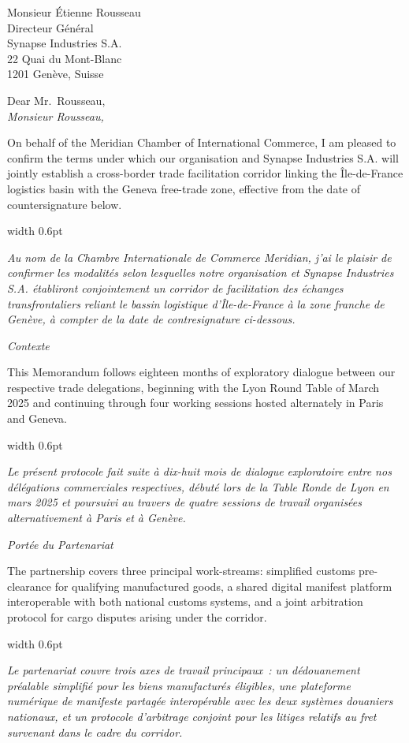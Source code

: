 \documentclass[paper=a4,fontsize=11pt,parskip=half,DIV=11,headsepline,footsepline,addrfield=true,backaddress=false,locfield=narrow,foldmarks=off,enlargefirstpage=on]{scrlttr2}
\newcommand{\bilingual}[2]{%
\noindent\begin{minipage}[t]{0.475\textwidth}\raggedright\small #1\end{minipage}\hspace{0.012\textwidth}%
{\color{gold}\vrule width 0.6pt}\hspace{0.012\textwidth}%
\begin{minipage}[t]{0.475\textwidth}\raggedright\small\itshape #2\end{minipage}\par\smallskip
}
\newcommand{\sectiontitle}[2]{%
\vspace{2pt}\noindent{\color{navy}\bfseries\large #1}\hfill{\color{gold}\itshape\small #2}\par
\noindent{\color{gold}\rule{\dimexpr\linewidth-11pt\relax}{0.7pt}}\par\smallskip
}
\begin{document}
\begin{letter}{Monsieur \'Etienne Rousseau\\Directeur G\'en\'eral\\Synapse Industries S.A.\\22 Quai du Mont-Blanc\\1201 Gen\`eve, Suisse}

\opening{Dear Mr.~Rousseau,\\[2pt]\textit{Monsieur Rousseau,}}

\bilingual{%
On behalf of the Meridian Chamber of International Commerce, I am pleased to confirm the terms under which our organisation and Synapse Industries S.A. will jointly establish a cross-border trade facilitation corridor linking the \^Ile-de-France logistics basin with the Geneva free-trade zone, effective from the date of countersignature below.
}{%
Au nom de la Chambre Internationale de Commerce Meridian, j'ai le plaisir de confirmer les modalit\'es selon lesquelles notre organisation et Synapse Industries S.A. \'etabliront conjointement un corridor de facilitation des \'echanges transfrontaliers reliant le bassin logistique d'\^Ile-de-France \`a la zone franche de Gen\`eve, \`a compter de la date de contresignature ci-dessous.
}

\sectiontitle{Background}{Contexte}

\bilingual{%
This Memorandum follows eighteen months of exploratory dialogue between our respective trade delegations, beginning with the Lyon Round Table of March 2025 and continuing through four working sessions hosted alternately in Paris and Geneva.
}{%
Le pr\'esent protocole fait suite \`a dix-huit mois de dialogue exploratoire entre nos d\'el\'egations commerciales respectives, d\'ebut\'e lors de la Table Ronde de Lyon en mars 2025 et poursuivi au travers de quatre sessions de travail organis\'ees alternativement \`a Paris et \`a Gen\`eve.
}

\sectiontitle{Scope of Partnership}{Port\'ee du Partenariat}

\bilingual{%
The partnership covers three principal work-streams: simplified customs pre-clearance for qualifying manufactured goods, a shared digital manifest platform interoperable with both national customs systems, and a joint arbitration protocol for cargo disputes arising under the corridor.
}{%
Le partenariat couvre trois axes de travail principaux~: un d\'edouanement pr\'ealable simplifi\'e pour les biens manufactur\'es \'eligibles, une plateforme num\'erique de manifeste partag\'ee interop\'erable avec les deux syst\`emes douaniers nationaux, et un protocole d'arbitrage conjoint pour les litiges relatifs au fret survenant dans le cadre du corridor.
}


\end{letter}
\end{document}
